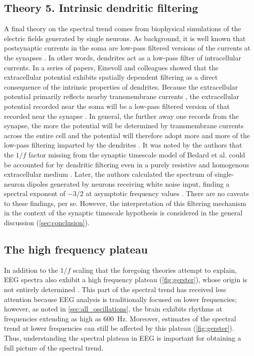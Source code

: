 \subsection{Theory 5. Intrinsic dendritic filtering}
A final theory on the spectral trend comes from biophysical simulations of the electric fields generated by single neurons. As background, it is well known that postsynaptic currents in the soma are low-pass filtered versions of the currents at the synapses \cite{Rall1967}. In other words, dendrites act as a low-pass filter of intracellular currents. In a series of papers, Einevoll and colleagues showed that the extracellular potential exhibits spatially dependent filtering as a direct consequence of the intrinsic properties of dendrites. Because the extracellular potential primarily reflects nearby transmembrane currents \cite{Nunez2006}, the extracellular potential recorded near the soma will be a low-pass filtered version of that recorded near the synapse \cite{Linden2010}. In general, the further away one records from the synapse, the more the potential will be determined by transmembrane currents across the entire cell and the potential will therefore adopt more and more of the low-pass filtering imparted by the dendrites \cite{Linden2010}. It was noted by the authors that the $1/f$ factor missing from the synaptic timescale model of Bedard et al. \cite{Bedard2006} could be accounted for by dendritic filtering even in a purely resistive and homogenous extracellular medium \cite{Linden2010,Pettersen2008}. Later, the authors calculated the spectrum of single-neuron dipoles generated by neurons receiving white noise input, finding a spectral exponent of $-3/2$ at asymptotic frequency values \cite{Pettersen2014}. There are no caveats to these findings, per se. However, the interpretation of this filtering mechanism in the context of the synaptic timescale hypothesis is considered in the general discussion (\autoref{sec:conclusion}). 

\subsection{The high frequency plateau} \label{sec:plateau}
In addition to the $1/f$ scaling that the foregoing theories attempt to explain, EEG spectra also exhibit a high frequency plateau (\autoref{fig:gerster}), whose origin is not entirely determined \cite{Gerster2022}. This part of the spectral trend has received less attention because EEG analysis is traditionally focused on lower frequencies; however, as noted in \autoref{sec:all_oscillations}, the brain exhibits rhythms at frequencies extending as high as \qty{600}{\hertz}. Moreover, estimates of the spectral trend at lower frequencies can still be affected by this plateau (\autoref{fig:gerster}). Thus, understanding the spectral plateau in EEG is important for obtaining a full picture of the spectral trend. 

